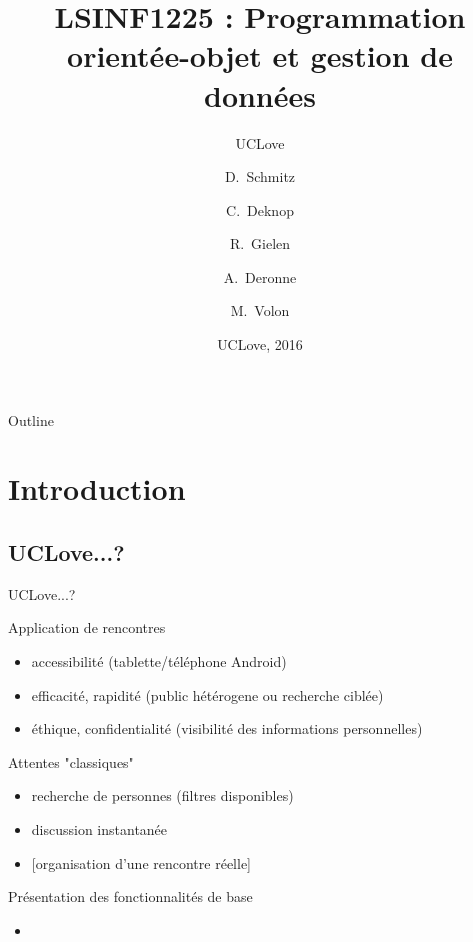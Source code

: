 \documentclass{beamer}
\title{LSINF1225 : Programmation orientée-objet et gestion de données}
\subtitle{UCLove}
\author{D.~Schmitz\inst{1} \and C.~Deknop\inst{2} \and R.~Gielen\inst{3} \and A.~Deronne\inst{4} \and M.~Volon\inst{5}}
\institute[Université de Louvain-la-Neuve] %
{
  \inst{1}%
  SINF11BA
  \and
  \inst{2}%
  SINF12BA
  \and
  \inst{3}%
  SINF12BA
  \and
  \inst{4}%
  SINF12BA
  \and
  \inst{5}%
  LING2MS/LA
  }
\date{UCLove, 2016}
\begin{document}
\begin{frame}
  \titlepage
\end{frame}

\begin{frame}{Outline}
  \tableofcontents
\end{frame}

\section{Introduction}

\subsection{UCLove...?}
\begin{frame}{UCLove...?}
\begin{block}{Application de rencontres}
	\begin{itemize}
		\item{
			accessibilit\'e (tablette/t\'el\'ephone Android)
		}
		\item{
			efficacit\'e, rapidit\'e (public h\'et\'erogene ou recherche cibl\'ee)
		}
		\item{
			\'ethique, confidentialit\'e (visibilit\'e des informations personnelles)
		}
	\end{itemize}
\end{block}
\begin{block}{Attentes "classiques"}
	\begin{itemize}
		\item{
			recherche de personnes (filtres disponibles)
		}
		\item{
			discussion instantan\'ee
		}
		\item{
			[organisation d'une rencontre r\'eelle]
		}
	\end{itemize}
\end{block}
\begin{block}{Pr\'esentation des fonctionnalit\'es de base}
\end{block}
\end{frame}

\begin{frame}
	\begin{itemize}
	
	\item{
	
	}
	\end{itemize}
\end{frame}
\end{document}
